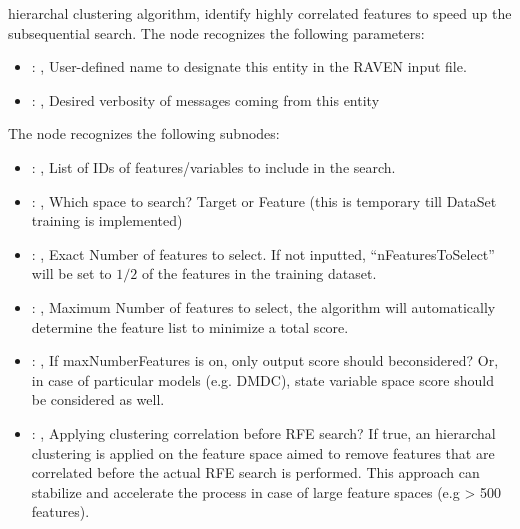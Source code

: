 \begin{itemize}
\begin{itemize}
          hierarchal clustering algorithm,         identify highly correlated features to speed up
          the subsequential search.
          The  node recognizes the following parameters:
            \begin{itemize}
              \item {}: ,
                User-defined name to designate this entity in the RAVEN input file.
              \item {}: ,
                Desired verbosity of messages coming from this entity
          \end{itemize}

          The  node recognizes the following subnodes:
          \begin{itemize}
            \item {}: ,
              List of IDs of features/variables to include in the search.

            \item {}: ,
              Which space to search? Target or Feature (this is temporary till DataSet training is
              implemented)

            \item {}: ,
              Exact Number of features to select. If not inputted, ``nFeaturesToSelect'' will be set
              to $1/2$ of the features in the training dataset.

            \item {}: ,
              Maximum Number of features to select, the algorithm will automatically determine the
              feature list to minimize a total score.

            \item {}: ,
              If maxNumberFeatures is on, only output score should beconsidered? Or, in case of
              particular models (e.g. DMDC), state variable space score should be considered as
              well.

            \item {}: ,
              Applying clustering correlation before RFE search? If true, an hierarchal clustering
              is applied on the feature         space aimed to remove features that are correlated
              before the actual RFE search is performed. This approach can stabilize and
              accelerate the process in case of large feature spaces (e.g > 500 features).


\end{itemize}
\end{itemize}
\end{itemize}
